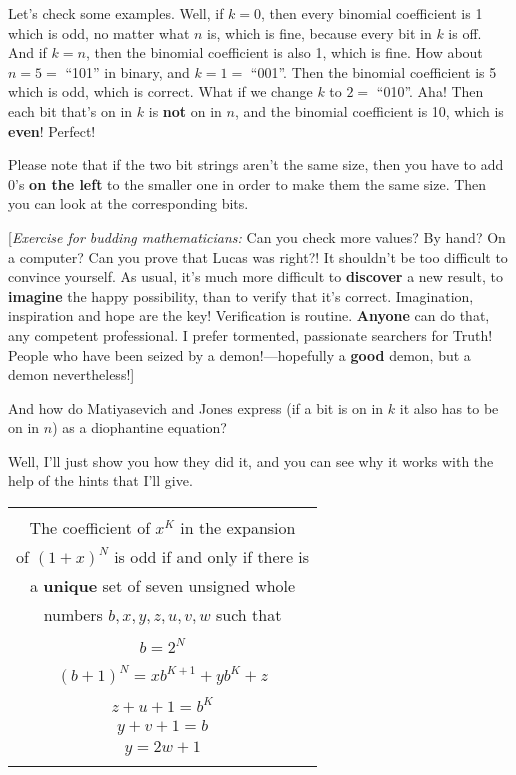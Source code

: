 \documentclass[12pt]{book}
\begin{document}
Let's check some examples. Well, if $k = 0$, then every binomial coefficient is 1 which is odd, no matter what
$n$ is, which is fine, because every bit in $k$ is off.
And if $k = n$, then the binomial coefficient is also 1, which is fine.
How about $n = 5 =$ ``101'' in binary, and $k = 1 =$ ``001''. Then the binomial coefficient is 5 which is odd,
which is correct.   What if we change $k$ to $2 =$ ``010''. Aha! 
Then each bit that's on in $k$ is \textbf{not} on in $n$,
and the binomial coefficient is 10, which is \textbf{even}!
Perfect!
 
Please note that
if the two bit strings aren't the same size, then you have to add 0's \textbf{on the left} to the
smaller one in order to make them the same size.  Then you can look at the corresponding bits.
 
{\footnotesize [\emph{Exercise for budding mathematicians:} Can you check more values? By hand? On a computer?
Can you prove that Lucas was right?!  It shouldn't be too difficult to convince yourself.
As usual, it's much more difficult to \textbf{discover} a new result, 
to \textbf{imagine} the happy possibility,
than to verify that it's correct. Imagination, inspiration and hope are the key!
Verification is routine. \textbf{Anyone} can do that, any competent professional.
I prefer tormented, passionate searchers for Truth!
People who have been seized by a demon!---hopefully a \textbf{good} demon, but a demon nevertheless!]}
 
And how do Matiyasevich and Jones express (if a bit is on in $k$ it also
has to be on in $n$) as a diophantine equation?
 
Well, I'll just show you how they did it, and you can see why it works
with the help of the hints that I'll give.
 
\begin{center}
\begin{tabular}{|c|}
\hline
\\
The coefficient of $x^K$ in the expansion 
\\
of $(1+x)^N$ is odd if and only if there is 
\\
a \textbf{unique} set of seven unsigned whole 
\\
numbers $b, x, y, z, u, v, w$ such that
\\ \\
$b = 2^N$
\\ \\
$(b+1)^N = x b^{K+1} + y b^K + z$ 
\\ \\
$z + u + 1 = b^K$ 
\\
$y + v + 1 = b$
\\
$y = 2w + 1$
\\
\\
\hline
\end{tabular}
\end{center}
\end{document}
